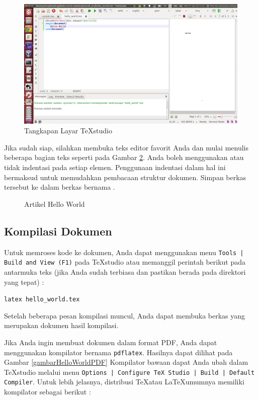 \documentclass{ta-scientics-matematika-its}
\begin{document}
        \begin{figure}[h] %
			\centering
			\includegraphics[width=\linewidth]{contoh_img/texstudio}
			\caption{Tangkapan Layar \TeX{}studio}
			\label{gambarTexStudio}
		\end{figure}

        Jika sudah siap, silahkan membuka teks editor favorit Anda dan mulai menulis beberapa bagian teks seperti pada Gambar \ref{kodeHelloWorld}. Anda boleh menggunakan atau tidak indentasi pada setiap elemen. Penggunaan indentasi dalam hal ini bermaksud untuk memudahkan pembacaan struktur dokumen. Simpan berkas tersebut ke dalam berkas bernama .

        \begin{figure}[h]
	        
	        \caption{Artikel Hello World}
	        \label{kodeHelloWorld}
        \end{figure}

        \subsection{Kompilasi Dokumen}

        Untuk memroses kode ke dokumen, Anda dapat menggunakan menu \texttt{Tools | Build and View (F1)} pada \TeX{}studio atau memanggil perintah berikut pada antarmuka teks (jika Anda sudah terbiasa dan pastikan berada pada direktori yang tepat) :

        \texttt{latex hello\_world.tex}

        Setelah beberapa pesan kompilasi muncul, Anda dapat membuka berkas  yang merupakan dokumen hasil kompilasi.

        Jika Anda ingin membuat dokumen dalam format PDF, Anda dapat menggunakan kompilator bernama \texttt{pdflatex}. Hasilnya dapat dilihat pada Gambar \ref{gambarHelloWorldPDF} Kompilator bawaan dapat Anda ubah dalam \TeX{}studio melalui menu \texttt{Options | Configure TeX Studio | Build | Default Compiler}. Untuk lebih jelasnya, distribusi \TeX atau \LaTeX umumnya memiliki kompilator sebagai berikut :
\end{document}
